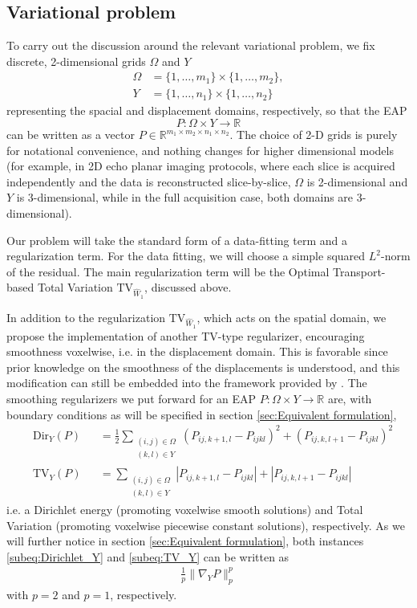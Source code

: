 \documentclass[journal,twoside,web]{ieeecolor}
\newcommand{\R}{\mathbb{R}}
\begin{document}
\subsection{Variational problem}
To carry out the discussion around the relevant variational problem, we fix discrete, 2-dimensional grids $\Omega$ and $Y$
\begin{align*}
    \Omega &= \{ 1, \dots, m_1 \} \times \{ 1, \dots, m_2 \},\\
    Y &= \{ 1, \dots, n_1 \} \times \{ 1, \dots, n_2 \}
\end{align*}
representing the spacial and displacement domains, respectively, so that the EAP
\[ P:\Omega \times Y \to \R \]
can be written as a vector $ P \in \R^{m_1 \times m_2 \times n_1 \times n_2} $. The choice of 2-D grids is purely for notational convenience, and nothing changes for higher dimensional models (for example, in 2D echo planar imaging protocols, where each slice is acquired independently and the data is reconstructed slice-by-slice, $\Omega$ is 2-dimensional and $Y$ is 3-dimensional, while in the full acquisition case, both domains are 3-dimensional).

Our problem will take the standard form of a data-fitting term and a regularization term. For the data fitting, we will choose a simple squared $L^2$-norm of the residual. The main regularization term will be the Optimal Transport-based Total Variation $\mathrm{TV}_{\hat{W}_1}$, discussed above.

In addition to the regularization $\mathrm{TV}_{\hat{W}_1}$, which acts on the spatial domain, we propose the implementation of another TV-type regularizer, encouraging smoothness voxelwise, i.e. in the displacement domain. This is favorable since prior knowledge on the smoothness of the displacements is understood, and this modification can still be embedded into the framework provided by \cite{TVW_Theory}. The smoothing regularizers we put forward for an EAP $P:\Omega \times Y \to \R$ are, with boundary conditions as will be specified in section \ref{sec:Equivalent formulation},
\begin{subequations}\label{eq:TV voxelwise}
\begin{alignat}{3}
  \label{subeq:Dirichlet_Y}
  & \mathrm{Dir}_Y(P) & &
  = \frac{1}{2} \sum_{\substack{ (i,j)\in\Omega \\ (k,l)\in Y }} ( P_{ij,k+1,l}-P_{ijkl} )^2 + ( P_{ij,k,l+1}-P_{ijkl} )^2 \\
  \label{subeq:TV_Y}
  & \mathrm{TV}_Y(P) & & = \sum_{\substack{ (i,j)\in\Omega \\ (k,l)\in Y }} | P_{ij,k+1,l}-P_{ijkl} | + | P_{ij,k,l+1}-P_{ijkl} |
\end{alignat}
\end{subequations}
i.e. a Dirichlet energy (promoting voxelwise smooth solutions) and Total Variation (promoting voxelwise piecewise constant solutions), respectively. As we will further notice in section \ref{sec:Equivalent formulation}, both instances \eqref{subeq:Dirichlet_Y} and \eqref{subeq:TV_Y} can be written as
\begin{align} \label{eq:voxelwise regularization compact}
    \frac{1}{p} \| \nabla_YP\|_p^p
\end{align}
with $p=2$ and $p=1$, respectively.
\end{document}
